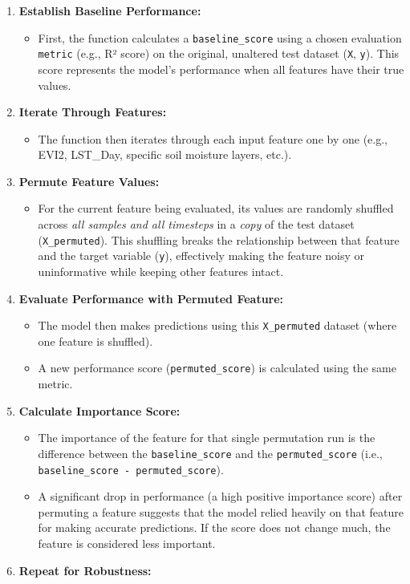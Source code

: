 \documentclass[
  letterpaper,
  DIV=11,
  numbers=noendperiod]{scrreprt}
\providecommand{\tightlist}{%
  \setlength{\itemsep}{0pt}\setlength{\parskip}{0pt}}\usepackage{longtable,booktabs,array}
\begin{document}
\begin{enumerate}
\def\labelenumi{\arabic{enumi}.}
\tightlist
\item
  \textbf{Establish Baseline Performance:}

  \begin{itemize}
  \tightlist
  \item
    First, the function calculates a \texttt{baseline\_score} using a
    chosen evaluation \texttt{metric} (e.g., R² score) on the original,
    unaltered test dataset (\texttt{X}, \texttt{y}). This score
    represents the model's performance when all features have their true
    values.
  \end{itemize}
\item
  \textbf{Iterate Through Features:}

  \begin{itemize}
  \tightlist
  \item
    The function then iterates through each input feature one by one
    (e.g., EVI2, LST\_Day, specific soil moisture layers, etc.).
  \end{itemize}
\item
  \textbf{Permute Feature Values:}

  \begin{itemize}
  \tightlist
  \item
    For the current feature being evaluated, its values are randomly
    shuffled across \emph{all samples and all timesteps} in a
    \emph{copy} of the test dataset (\texttt{X\_permuted}). This
    shuffling breaks the relationship between that feature and the
    target variable (\texttt{y}), effectively making the feature noisy
    or uninformative while keeping other features intact.
  \end{itemize}
\item
  \textbf{Evaluate Performance with Permuted Feature:}

  \begin{itemize}
  \tightlist
  \item
    The model then makes predictions using this \texttt{X\_permuted}
    dataset (where one feature is shuffled).
  \item
    A new performance score (\texttt{permuted\_score}) is calculated
    using the same metric.
  \end{itemize}
\item
  \textbf{Calculate Importance Score:}

  \begin{itemize}
  \tightlist
  \item
    The importance of the feature for that single permutation run is the
    difference between the \texttt{baseline\_score} and the
    \texttt{permuted\_score} (i.e.,
    \texttt{baseline\_score\ -\ permuted\_score}).
  \item
    A significant drop in performance (a high positive importance score)
    after permuting a feature suggests that the model relied heavily on
    that feature for making accurate predictions. If the score does not
    change much, the feature is considered less important.
  \end{itemize}
\item
  \textbf{Repeat for Robustness:}


\end{enumerate}
\end{document}
